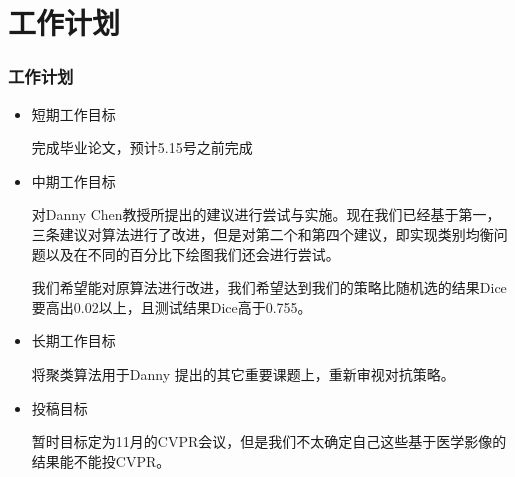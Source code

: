 \documentclass[9pt]{beamer}
\begin{document}
\section*{工作计划}
\begin{frame}[fragile]
	\frametitle{工作计划}
	\begin{itemize}
		

	\item 短期工作目标

	完成毕业论文，预计5.15号之前完成

	\item 中期工作目标

	对Danny Chen教授所提出的建议进行尝试与实施。现在我们已经基于第一，三条建议对算法进行了改进，但是对第二个和第四个建议，即实现类别均衡问题以及在不同的百分比下绘图我们还会进行尝试。
	
	我们希望能对原算法进行改进，我们希望达到我们的策略比随机选的结果Dice要高出0.02以上，且测试结果Dice高于0.755。

	\item 长期工作目标

	将聚类算法用于Danny 提出的其它重要课题上，重新审视对抗策略。

	\item 投稿目标

	暂时目标定为11月的CVPR会议，但是我们不太确定自己这些基于医学影像的结果能不能投CVPR。
	\end{itemize}




\end{frame}
\end{document}
